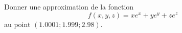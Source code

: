 
\begin{exercice}\label{exoOutilsMath-0056}

    Donner une approximation de la fonction
    \begin{equation}
        f(x,y,z)=xe^x+ye^y+ze^z
    \end{equation}
    au point $(1.0001;1.999;2.98)$.

\end{exercice}
